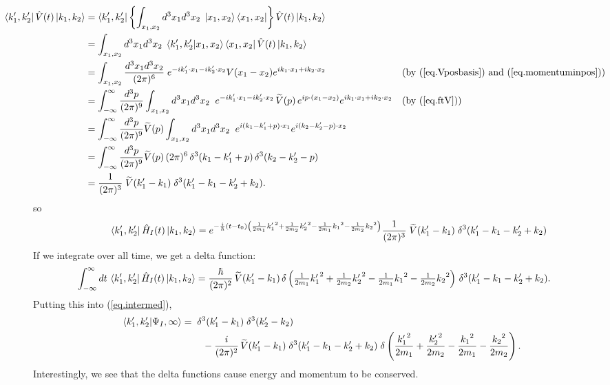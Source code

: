 \begin{align*}
\hspace{-4em}\bra{k_1^\prime, k_2^\prime} \op{V}(t) \ket{k_1, k_2} &= \bra{k_1^\prime, k_2^\prime} \left\{\int_{x_1, x_2} {d^3 x_1 d^3 x_2\;} \ket{x_1, x_2}\bra{x_1, x_2}\right\}\op{V}(t) \ket{k_1, k_2} \nonumber\\
&= \int_{x_1, x_2} {d^3 x_1 d^3 x_2\;} \braket{k_1^\prime, k_2^\prime}{x_1, x_2}\bra{x_1, x_2}\op{V}(t) \ket{k_1, k_2} \nonumber\\
&= \int_{x_1, x_2} \frac{d^3 x_1 d^3 x_2}{(2\pi)^6}\; e^{-ik_1^\prime\cdot x_1 - ik_2^\prime\cdot x_2}V(x_1 - x_2) e^{ik_1\cdot x_1 + ik_2\cdot x_2} &&\text{(by (\ref{eq.Vposbasis}) and (\ref{eq.momentuminpos}))}\nonumber\\
&= \int_{-\infty}^{\infty} \frac{d^3p}{(2\pi)^9}\int_{x_1, x_2} {d^3 x_1 d^3 x_2\;\;}e^{-ik_1^\prime\cdot x_1 - ik_2^\prime\cdot x_2}\,\widetilde{V}(p)\,e^{ip\cdot(x_1-x_2)} e^{ik_1\cdot x_1 + ik_2\cdot x_2}
&&\text{(by (\ref{eq.ftV}))}\nonumber\\
&= \int_{-\infty}^{\infty} \frac{d^3p}{(2\pi)^9}\widetilde{V}(p) \int_{x_1, x_2} {d^3 x_1 d^3 x_2\;\;}e^{i(k_1-k_1^\prime+p)\cdot x_1}e^{i(k_2-k_2^\prime-p)\cdot x_2}\nonumber\\
&= \int_{-\infty}^{\infty} \frac{d^3p}{(2\pi)^9}\widetilde{V}(p) \,(2\pi)^6\,\delta^3(k_1-k_1^\prime+p)\,\delta^3(k_2-k_2^\prime-p)\nonumber\\
&= \frac{1}{(2\pi)^3}\;\widetilde{V}(k_1^\prime-k_1) \;\delta^3(k_1^\prime-k_1-k_2^\prime+k_2).
\end{align*}
so 
\[
\left\langle k_1^\prime, k_2^\prime\right| \hat{H}_I(t)\left|k_1, k_2\right\rangle
=
e^{-\frac{i}{\hbar}\left(t-t_0\right)\left(\frac{1}{2m_1}{k_1^\prime}^2 + \frac{1}{2m_2}{k_2^\prime}^2 - \frac{1}{2m_1}{k_1}^2 - \frac{1}{2m_2}{k_2}^2\right)}\frac{1}{(2\pi)^3}\;\widetilde{V}(k_1^\prime-k_1) \;\delta^3(k_1^\prime-k_1-k_2^\prime+k_2)
\]
If we integrate over all time, we get a delta function:
\begin{equation}\label{eq.HIintegrated}
\hspace{-3em}
\int_{-\infty}^\infty dt \,\bra{k_1^\prime, k_2^\prime} \op{H}_I(t)\ket{k_1, k_2}
=
\frac{\hbar}{(2\pi)^2}\,\widetilde{V}(k_1^\prime-k_1)\,\delta\left({\textstyle\frac{1}{2m_1}{k_1^\prime}^2 + \frac{1}{2m_2}{k_2^\prime}^2 - \frac{1}{2m_1}{k_1}^2 - \frac{1}{2m_2}{k_2}^2}\right) \,\delta^3(k_1^\prime-k_1-k_2^\prime+k_2).
\end{equation}
Putting this into (\ref{eq.intermed}),
\begin{align}
\hspace{-1.5em}\left\langle k_1^\prime, k_2^\prime|\Psi_I, \infty\right\rangle
=& \;\;\delta^3(k_1^\prime - k_1)\;\delta^3(k_2^\prime - k_2) \nonumber\\&\;\;\;\;- \frac{i}{(2\pi)^2}\, \widetilde{V}(k_1^\prime-k_1) \;\delta^3(k_1^\prime-k_1-k_2^\prime+k_2) \;\delta\left(\frac{{k_1^\prime}^2}{2m_1} + \frac{{k_2^\prime}^2}{2m_2} - \frac{{k_1}^2}{2m_1} - \frac{{k_2}^2}{2m_2}\right).
\end{align}
Interestingly, we see that the delta functions cause energy and momentum to be conserved.

